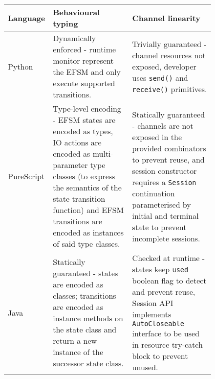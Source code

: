 \begin{figure}[!h]
\centering
\begin{tabular}{l || p{} | p{}}
Language & Behavioural typing & Channel linearity \\
\hline\hline
Python \cite{Python2017} & Dynamically enforced - runtime monitor represent the EFSM and only execute supported transitions. & Trivially guaranteed - channel resources not exposed, developer uses \texttt{send()} and \texttt{receive()} primitives. \\
\hline
PureScript \cite{PureScript2019} & Type-level encoding - EFSM states are encoded as types, IO actions are encoded as multi-parameter type classes (to express the semantics of the state transition function) and EFSM transitions are encoded as instances of said type classes. & Statically guaranteed - channels are not exposed in the provided combinators to prevent reuse, and session constructor requires a \texttt{Session} continuation parameterised by initial and terminal state to prevent incomplete sessions.  \\
\hline
Java \cite{Hybrid2016} & Statically guaranteed - states are encoded as classes; transitions are encoded as instance methods on the state class and return a new instance of the successor state class. & Checked at runtime - states keep \texttt{used} boolean flag to detect and prevent reuse, Session API implements \texttt{AutoCloseable} interface to be used in resource try-catch block to prevent unused.
\end{tabular}
\label{table:comparison}
\end{figure}
